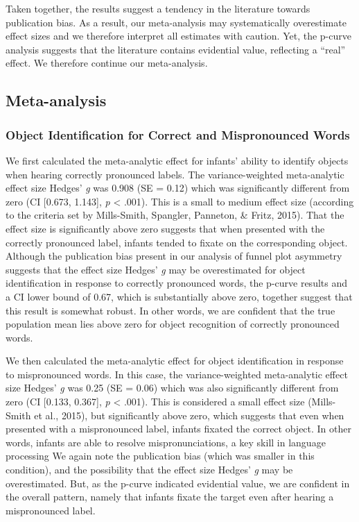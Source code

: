 \documentclass[man]{apa6}
\theoremstyle{definition}
\theoremstyle{definition}
\theoremstyle{definition}
\theoremstyle{remark}
\begin{document}
Taken together, the results suggest a tendency in the literature towards
publication bias. As a result, our meta-analysis may systematically
overestimate effect sizes and we therefore interpret all estimates with
caution. Yet, the p-curve analysis suggests that the literature contains
evidential value, reflecting a \enquote{real} effect. We therefore
continue our meta-analysis.

\subsection{Meta-analysis}\label{meta-analysis-1}

\subsubsection{Object Identification for Correct and Mispronounced
Words}\label{object-identification-for-correct-and-mispronounced-words}

We first calculated the meta-analytic effect for infants' ability to
identify objects when hearing correctly pronounced labels. The
variance-weighted meta-analytic effect size Hedges' \emph{g} was 0.908
(SE = 0.12) which was significantly different from zero (CI {[}0.673,
1.143{]}, \emph{p} \textless{} .001). This is a small to medium effect
size (according to the criteria set by Mills-Smith, Spangler, Panneton,
\& Fritz, 2015). That the effect size is significantly above zero
suggests that when presented with the correctly pronounced label,
infants tended to fixate on the corresponding object. Although the
publication bias present in our analysis of funnel plot asymmetry
suggests that the effect size Hedges' \emph{g} may be overestimated for
object identification in response to correctly pronounced words, the
p-curve results and a CI lower bound of 0.67, which is substantially
above zero, together suggest that this result is somewhat robust. In
other words, we are confident that the true population mean lies above
zero for object recognition of correctly pronounced words.

We then calculated the meta-analytic effect for object identification in
response to mispronounced words. In this case, the variance-weighted
meta-analytic effect size Hedges' \emph{g} was 0.25 (SE = 0.06) which
was also significantly different from zero (CI {[}0.133, 0.367{]},
\emph{p} \textless{} .001). This is considered a small effect size
(Mills-Smith et al., 2015), but significantly above zero, which suggests
that even when presented with a mispronounced label, infants fixated the
correct object. In other words, infants are able to resolve
mispronunciations, a key skill in language processing We again note the
publication bias (which was smaller in this condition), and the
possibility that the effect size Hedges' \emph{g} may be overestimated.
But, as the p-curve indicated evidential value, we are confident in the
overall pattern, namely that infants fixate the target even after
hearing a mispronounced label.
\end{document}
